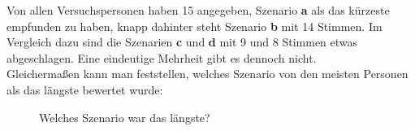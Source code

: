 \documentclass{Paper}
\begin{document}
Von allen Versuchspersonen haben 15 angegeben, Szenario \textbf{a} als das kürzeste empfunden zu haben, knapp dahinter steht Szenario \textbf{b} mit 14 Stimmen. Im Vergleich dazu sind die Szenarien \textbf{c} und \textbf{d} mit 9 und 8 Stimmen etwas abgeschlagen. Eine eindeutige Mehrheit gibt es dennoch nicht.\\
Gleichermaßen kann man feststellen, welches Szenario von den meisten Personen als das längste bewertet wurde:

\begin{figure}[ht]
\caption{Welches Szenario war das längste?}
\label{SzenarienLang}
\end{figure}       
\end{document}
